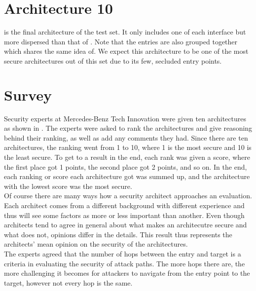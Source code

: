 \section{Architecture 10}
\label{subsec:arch10}

 is the final architecture of the test set. 
It only includes one of each interface but more dispersed than that of . 
Note that the entries are also grouped together which shares the same idea of. 
We expect this architecture to be one of the most secure architectures out of this set due to its few, secluded entry points.

\section{Survey}
\label{sec:survey}

Security experts at Mercedes-Benz Tech Innovation were given ten architectures as shown in .
The experts were asked to rank the architectures and give reasoning behind their ranking, as well as add any comments they had.
Since there are ten architectures, the ranking went from 1 to 10, where 1 is the most secure and 10 is the least secure.
To get to a result in the end, each rank was given a score, where the first place got 1 points, the second place got 2 points, and so on.
In the end, each ranking or score each architecture got was summed up, and the architecture with the lowest score was the most secure.\\

Of course there are many ways how a security architect approaches an evaluation.
Each architect comes from a different background with different experience and thus will see some factors as more or less important than another.
Even though architects tend to agree in general about what makes an architecutre secure and what does not, opinions differ in the details.
This result thus represents the architects' mean opinion on the security of the architectures.\\

The experts agreed that the number of hops between the entry and target is a criteria in evaluating the security of attack paths. 
The more hops there are, the more challenging it becomes for attackers to navigate from the entry point to the target, however not every hop is the same.\\

